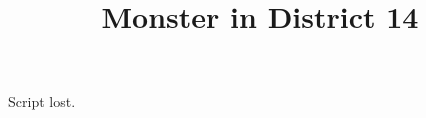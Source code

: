\documentclass[11pt]{article}
\begin{document}
\ttfamily
\title{Monster in District 14}
\maketitle
Script lost.
\end{document}
